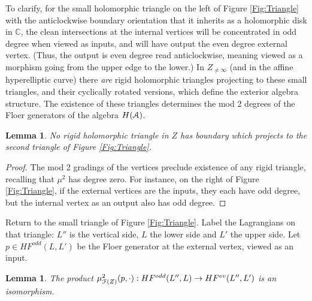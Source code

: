 \documentclass[reqno,10pt]{amsart}
\numberwithin{equation}{section}
\newcommand{\bC}{{\mathbb C}}
\newcommand{\scrF}{\EuScript{F}}
\newcommand{\scrA}{\EuScript{A}}
\newtheorem{Lemma}[thm]{Lemma}
\theoremstyle{remark}
\begin{document}
To clarify, for the small holomorphic triangle on the left of Figure \ref{Fig:Triangle} with the anticlockwise boundary orientation that it inherits as a holomorphic disk in $\bC$, the clean intersections at the internal vertices will be concentrated in odd degree when viewed as inputs, and will have output the even degree external vertex. (Thus, the output is even degree read anticlockwise, meaning viewed as a morphism going from the upper edge to the lower.) In $Z_{\neq\infty}$ (and in the affine hyperelliptic curve) there \emph{are} rigid holomorphic triangles projecting to these small triangles, and their cyclically rotated versions, which define the exterior algebra structure. The existence of these triangles determines the mod 2 degrees of the Floer generators of the algebra $H(\scrA)$.

\begin{Lemma} \label{Lem:NotOne}
No rigid holomorphic triangle in $Z$  has boundary which projects to the second triangle of Figure \ref{Fig:Triangle}.
\end{Lemma}

\begin{proof}
The mod 2 gradings of the vertices preclude existence of any rigid triangle, recalling that $\mu^2$ has degree zero. For instance, on the right of Figure \ref{Fig:Triangle}, if the external vertices are the inputs, they each have odd degree, but the internal vertex as an output also has odd degree.
\end{proof}

Return to the small triangle of Figure \ref{Fig:Triangle}.  Label the Lagrangians on that triangle: $L''$ is the vertical side, $L$ the lower side and $L'$ the upper side.  Let $p \in HF^{odd}(L,L')$ be the Floer generator at the external vertex, viewed as an input.

\begin{Lemma} \label{Lem:NoTriangle}
The product $\mu^2_{\scrF(Z)}(p,\cdot): HF^{odd}(L'',L) \rightarrow HF^{ev}(L'', L')$ is an isomorphism.
\end{Lemma}
\end{document}
